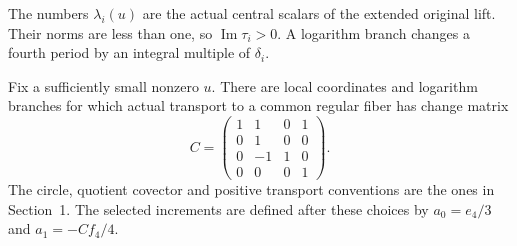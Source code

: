 \documentclass[11pt]{article}
\numberwithin{equation}{section}
\begin{document}
The numbers $\lambda_i(u)$ are the actual central scalars of the
extended original lift. Their norms are less than one, so
$\operatorname{Im}\tau_i>0$. A logarithm branch changes a fourth
period by an integral multiple of $\delta_i$.

\begin{proposition}\label{hol:prop:global-marking}
Fix a sufficiently small nonzero $u$.
There are local coordinates and logarithm branches for which actual
transport to a common regular fiber has change matrix
\[
 C=\begin{pmatrix}1&1&0&1\\0&1&0&0\\0&-1&1&0\\0&0&0&1\end{pmatrix}.
\]
The circle, quotient covector and positive transport conventions are
the ones in Section~1. The selected increments are defined after
these choices by $a_0=e_4/3$ and $a_1=-Cf_4/4$.
\end{proposition}
\end{document}
